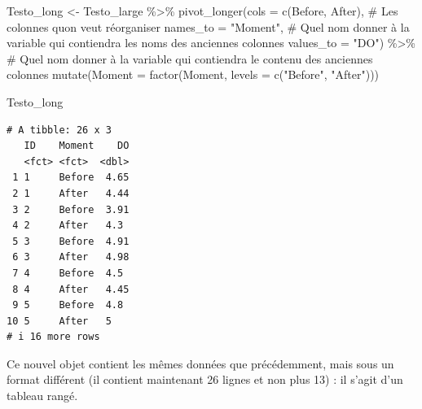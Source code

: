 \documentclass[
  a4paper,
  DIV=11,
  numbers=noendperiod,
  oneside]{scrreprt}
\newenvironment{Shaded}{}{}
\newcommand{\AttributeTok}[1]{\textcolor[rgb]{0.84,0.23,0.29}{#1}}
\newcommand{\CommentTok}[1]{\textcolor[rgb]{0.42,0.45,0.49}{#1}}
\newcommand{\FunctionTok}[1]{\textcolor[rgb]{0.44,0.26,0.76}{#1}}
\newcommand{\NormalTok}[1]{\textcolor[rgb]{0.14,0.16,0.18}{#1}}
\newcommand{\OtherTok}[1]{\textcolor[rgb]{0.44,0.26,0.76}{#1}}
\newcommand{\SpecialCharTok}[1]{\textcolor[rgb]{0.00,0.36,0.77}{#1}}
\newcommand{\StringTok}[1]{\textcolor[rgb]{0.01,0.18,0.38}{#1}}
\begin{document}
\begin{Shaded}
\begin{Highlighting}[]
\NormalTok{Testo\_long }\OtherTok{\textless{}{-}}\NormalTok{ Testo\_large }\SpecialCharTok{\%\textgreater{}\%}
  \FunctionTok{pivot\_longer}\NormalTok{(}\AttributeTok{cols =} \FunctionTok{c}\NormalTok{(Before, After),   }\CommentTok{\# Les colonnes qu\textquotesingle{}on veut réorganiser}
               \AttributeTok{names\_to =} \StringTok{"Moment"}\NormalTok{,   }\CommentTok{\# Quel nom donner à la variable qui contiendra les noms des anciennes colonnes}
               \AttributeTok{values\_to =} \StringTok{"DO"}\NormalTok{) }\SpecialCharTok{\%\textgreater{}\%}      \CommentTok{\# Quel nom donner à la variable qui contiendra le contenu des anciennes colonnes}
  \FunctionTok{mutate}\NormalTok{(}\AttributeTok{Moment =} \FunctionTok{factor}\NormalTok{(Moment, }\AttributeTok{levels =} \FunctionTok{c}\NormalTok{(}\StringTok{"Before"}\NormalTok{, }\StringTok{"After"}\NormalTok{)))}

\NormalTok{Testo\_long}
\end{Highlighting}
\end{Shaded}

\begin{verbatim}
# A tibble: 26 x 3
   ID    Moment    DO
   <fct> <fct>  <dbl>
 1 1     Before  4.65
 2 1     After   4.44
 3 2     Before  3.91
 4 2     After   4.3 
 5 3     Before  4.91
 6 3     After   4.98
 7 4     Before  4.5 
 8 4     After   4.45
 9 5     Before  4.8 
10 5     After   5   
# i 16 more rows
\end{verbatim}

Ce nouvel objet contient les mêmes données que précédemment, mais sous
un format différent (il contient maintenant 26 lignes et non plus 13) :
il s'agit d'un tableau rangé.
\end{document}
